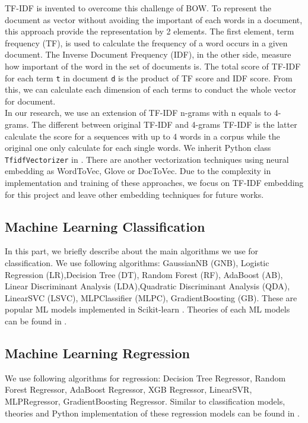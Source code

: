 TF-IDF \cite{008} is invented to overcome this challenge of BOW. To represent the document as vector without avoiding the important of each words in a document, this approach provide the representation by 2 elements. The first element, term frequency (TF), is used to calculate the frequency of a word occurs in a given document. The Inverse Document Frequency (IDF), in the other side, measure how important of the word in the set of documents is. The total score of TF-IDF for each term \texttt{t} in document \texttt{d} is the product of TF score and IDF score. From this, we can calculate each dimension of each terms to conduct the whole vector for document.
\\
In our research, we use an extension of TF-IDF n-grams with n equals to 4-grams. The different between original TF-IDF and 4-grams TF-IDF is the latter calculate the score for a sequences with up to 4 words in a corpus while the original one only calculate for each single words. We inherit Python class \texttt{TfidfVectorizer} in \cite{009}. There are another vectorization techniques using neural embedding as WordToVec, Glove or DocToVec. Due to the complexity in implementation and training of these approaches, we focus on TF-IDF embedding for this project and leave other embedding techniques for future works.


\subsection{Machine Learning Classification}
In this part, we briefly describe about the main algorithms we use for classification. We use following algorithms: GaussianNB (GNB), Logistic Regression (LR),Decision Tree (DT),
Random Forest (RF), AdaBoost (AB), Linear Discriminant Analysis (LDA),Quadratic Discriminant Analysis (QDA),
LinearSVC (LSVC), MLPClassifier (MLPC), GradientBoosting (GB). These are popular ML models implemented in Scikit-learn \cite{010}. Theories of each ML models can be found in \cite{011,012}. 


\subsection{Machine Learning Regression}
We use following algorithms for regression: Decision Tree Regressor, Random Forest Regressor, AdaBoost Regressor,
XGB Regressor,
LinearSVR, MLPRegressor, GradientBoosting Regressor. Similar to classification models, theories and Python implementation of these regression models can be found in \cite{010,011,012}.


